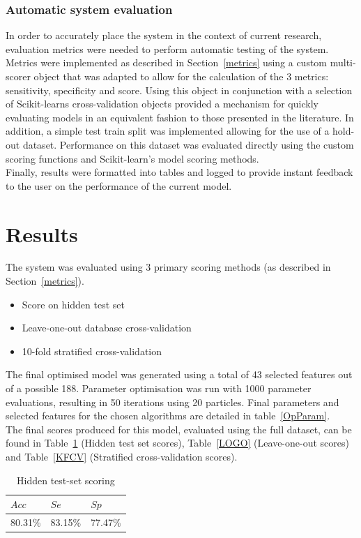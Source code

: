 \documentclass[titlepage, 12pt]{scrartcl} \usepackage{enumitem}
\begin{document}
\subsubsection{Automatic system evaluation}
In order to accurately place the system in the context of current research,
evaluation metrics were needed to perform automatic testing of the system.
Metrics were implemented as described in Section~\ref{metrics} using a custom
multi-scorer object that was adapted to allow for the calculation of the 3
metrics: sensitivity, specificity and score. Using this object in conjunction
with a selection of Scikit-learns cross-validation objects provided a mechanism
for quickly evaluating models in an equivalent fashion to those presented in
the literature. In addition, a simple test train split was implemented allowing
for the use of a hold-out dataset. Performance on this dataset was evaluated
directly using the custom scoring functions and Scikit-learn's model scoring
methods.\\
Finally, results were formatted into tables and logged to provide instant
feedback to the user on the performance of the current model.

\section{Results}\label{Eval}
The system was evaluated using 3 primary scoring methods (as described in
Section~\ref{metrics}).
\begin{itemize}
    \item Score on hidden test set
    \item Leave-one-out database cross-validation
    \item 10-fold stratified cross-validation
\end{itemize}

The final optimised model was generated using a total of 43 selected features
out of a possible 188. Parameter optimisation was run with 1000 parameter
evaluations, resulting in 50 iterations using 20 particles. Final parameters
and selected features 
for the chosen algorithms are detailed in table~\ref{OpParam}.\\
The final scores produced for this model, evaluated using the full dataset, can
be found in Table~\ref{TestSet} (Hidden test set scores), Table~\ref{LOGO}
(Leave-one-out scores) and
Table~\ref{KFCV} (Stratified cross-validation scores).

\begin{table}[H]
\centering
\caption{Hidden test-set scoring}
\label{TestSet}
\begin{tabular}{@{}lll@{}}
\toprule
$Acc$  & $Se$    & $Sp$    \\ \midrule
80.31\% & 83.15\% & 77.47\% \\ \bottomrule
\end{tabular}
\end{table}
\end{document}
